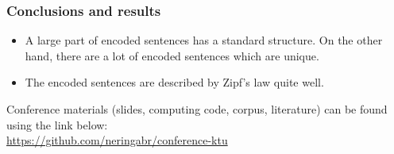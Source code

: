 \documentclass{beamer}
\begin{document}

\begin{frame}
\frametitle{Conclusions and results}
\begin{itemize}
\item A large part of encoded sentences has a standard structure. On the 
other hand, there are a lot of encoded sentences which are unique.
\item The encoded sentences are described by Zipf's law quite well.
\end{itemize}
\end{frame}

\begin{frame}
\begin{center}
Conference materials (slides, computing code, corpus, literature) can be found
using the link below: \\
\href{https://github.com/neringabr/conference-ktu}{https://github.com/neringabr/conference-ktu}
\end{center}
\end{frame}
\end{document}
